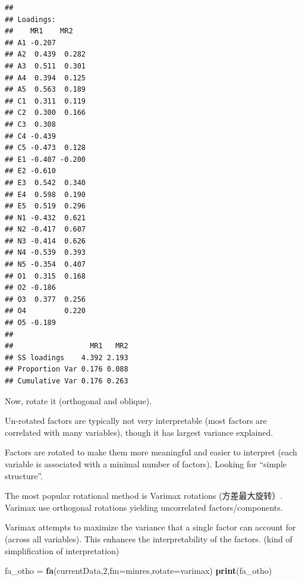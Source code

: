 \documentclass[
]{ctexart}
\newenvironment{Shaded}{\begin{snugshade}}{\end{snugshade}}
\newcommand{\AttributeTok}[1]{\textcolor[rgb]{0.13,0.29,0.53}{#1}}
\newcommand{\DecValTok}[1]{\textcolor[rgb]{0.00,0.00,0.81}{#1}}
\newcommand{\FunctionTok}[1]{\textcolor[rgb]{0.13,0.29,0.53}{\textbf{#1}}}
\newcommand{\NormalTok}[1]{#1}
\newcommand{\OtherTok}[1]{\textcolor[rgb]{0.56,0.35,0.01}{#1}}
\newcommand{\StringTok}[1]{\textcolor[rgb]{0.31,0.60,0.02}{#1}}
\begin{document}
\begin{verbatim}
## 
## Loadings:
##    MR1    MR2   
## A1 -0.207       
## A2  0.439  0.282
## A3  0.511  0.301
## A4  0.394  0.125
## A5  0.563  0.189
## C1  0.311  0.119
## C2  0.300  0.166
## C3  0.308       
## C4 -0.439       
## C5 -0.473  0.128
## E1 -0.407 -0.200
## E2 -0.610       
## E3  0.542  0.340
## E4  0.598  0.190
## E5  0.519  0.296
## N1 -0.432  0.621
## N2 -0.417  0.607
## N3 -0.414  0.626
## N4 -0.539  0.393
## N5 -0.354  0.407
## O1  0.315  0.168
## O2 -0.186       
## O3  0.377  0.256
## O4         0.220
## O5 -0.189       
## 
##                  MR1   MR2
## SS loadings    4.392 2.193
## Proportion Var 0.176 0.088
## Cumulative Var 0.176 0.263
\end{verbatim}

Now, rotate it (orthogonal and oblique).

Un-rotated factors are typically not very interpretable (most factors
are correlated with many variables), though it has largest variance
explained.

Factors are rotated to make them more meaningful and easier to interpret
(each variable is associated with a minimal number of factors). Looking
for ``simple structure''.

The most popular rotational method is Varimax rotations (方差最大旋转）.
Varimax use orthogonal rotations yielding uncorrelated
factors/components.

Varimax attempts to maximize the variance that a single factor can
account for (across all variables). This enhances the interpretability
of the factors. (kind of simplification of interpretation)

\begin{Shaded}
\begin{Highlighting}[]
\NormalTok{fa\_otho }\OtherTok{=} \FunctionTok{fa}\NormalTok{(currentData,}\DecValTok{2}\NormalTok{,}\AttributeTok{fm=}\StringTok{\textquotesingle{}minres\textquotesingle{}}\NormalTok{,}\AttributeTok{rotate=}\StringTok{\textquotesingle{}varimax\textquotesingle{}}\NormalTok{)}
\FunctionTok{print}\NormalTok{(fa\_otho)}
\end{Highlighting}
\end{Shaded}
\end{document}
